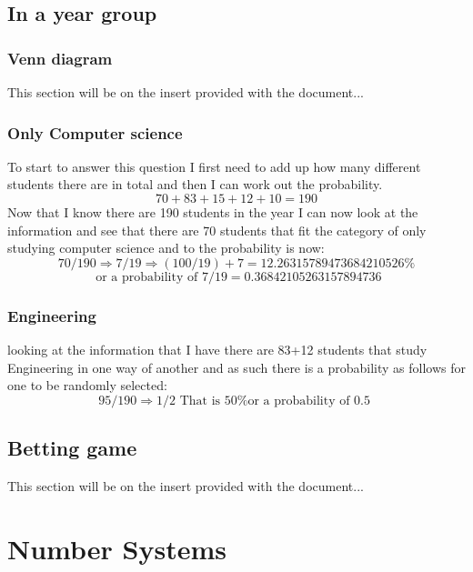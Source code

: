 \documentclass{article}
\begin{document}
\subsection{In a year group}
\subsubsection{Venn diagram}
This section will be on the insert provided with the document...
\subsubsection{Only Computer science}
To start to answer this question I first need to add up how many different students there are in total and then I can work out the probability. 
\[
	70+83+15+12+10 = 190
\]
Now that I know there are 190 students in the year I can now look at the information and see that there are 70 students that fit the category of only studying computer science and to the probability is now:
\[
	70/190 \Rightarrow 7/19 \Rightarrow (100/ 19)+7 = 12.26315789473684210526\% 
\]
\[
	\mbox{ or a probability of } 7/19 = 0.36842105263157894736  
\]
\subsubsection{Engineering}
looking at the information that I have there are 83+12 students that study Engineering in one way of another and as such there is a probability as follows for one to be randomly selected:
\[
	95 / 190 \Rightarrow 1/2 \mbox{ That is 50\% or a probability of 0.5 }
\]
\subsection{Betting game}
This section will be on the insert provided with the document...
\section{Number Systems}
\end{document}
